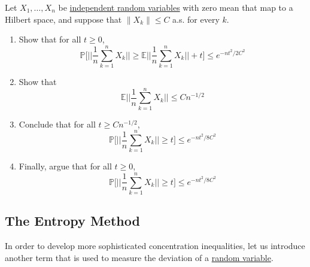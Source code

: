   \begin{exercise}

  \end{exercise}

  \begin{exercise}
  Let $X_1, \ldots, X_n$ be \hyperref[prob-def:independent-random-variables]{independent random variables} with zero mean that map to a Hilbert space, and suppose that $\|X_k\| \leq C$ a.s. for every $k$. 
  \begin{enumerate}
      \item Show that for all $t \geq 0$, 
      \begin{equation}
        \mathbb{P} \bigg[ \bigg| \bigg| \frac{1}{n} \sum_{k=1}^n X_k \bigg| \bigg| \geq \mathbb{E} \bigg| \bigg| \frac{1}{n} \sum_{k=1}^n X_k \bigg| \bigg| + t \bigg] \leq e^{-nt^2 / 2C^2}
      \end{equation}
      
      \item Show that 
      \begin{equation}
        \mathbb{E} \bigg| \bigg| \frac{1}{n} \sum_{k=1}^n X_k \bigg| \bigg| \leq C n^{-1/2}
      \end{equation}
      
      \item Conclude that for all $t \geq C n^{-1/2}$, 
      \begin{equation}
        \mathbb{P} \bigg[ \bigg| \bigg| \frac{1}{n} \sum_{k=1}^n X_k \bigg| \bigg| \geq t \bigg] \leq e^{-nt^2 / 8C^2}
      \end{equation}
      
      \item Finally, argue that for all $t \geq 0$, 
      \begin{equation}
        \mathbb{P} \bigg[ \bigg| \bigg| \frac{1}{n} \sum_{k=1}^n X_k \bigg| \bigg| \geq t \bigg] \leq e^{-nt^2 / 8C^2}
      \end{equation}
  \end{enumerate}
  \end{exercise}

\subsection{The Entropy Method}

  In order to develop more sophisticated concentration inequalities, let us introduce another term that is used to measure the deviation of a \hyperref[prob-def:random-variable]{random variable}. 

